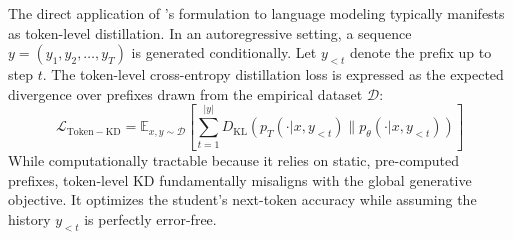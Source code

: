 \documentclass{article} %
\newcommand{\KL}{D_{\mathrm{KL}}}
\newcommand{\ptheta}{p_\theta}
\newcommand{\pteacher}{p_T}
\newcommand{\loss}{\mathcal{L}}
\begin{document}
The direct application of \citet{hinton2015distilling}'s formulation to language modeling typically manifests as token-level distillation. In an autoregressive setting, a sequence $y = (y_1, y_2, \dots, y_T)$ is generated conditionally. Let $y_{<t}$ denote the prefix up to step $t$. The token-level cross-entropy distillation loss is expressed as the expected divergence over prefixes drawn from the empirical dataset $\mathcal{D}$:
\begin{equation}
    \loss_{\mathrm{Token-KD}} = \mathbb{E}_{x, y \sim \mathcal{D}} \left[ \sum_{t=1}^{|y|} \KL(\pteacher(\cdot | x, y_{<t}) \parallel \ptheta(\cdot | x, y_{<t})) \right]
\end{equation}
While computationally tractable because it relies on static, pre-computed prefixes, token-level KD fundamentally misaligns with the global generative objective. It optimizes the student's next-token accuracy while assuming the history $y_{<t}$ is perfectly error-free. 
\end{document}

